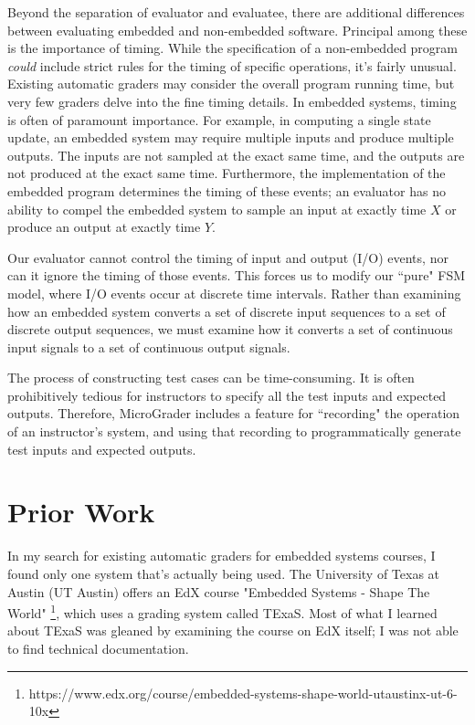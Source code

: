 \documentclass[12pt]{article}
\begin{document}
Beyond the separation of evaluator and evaluatee, there are additional differences between evaluating embedded and non-embedded software.  Principal among these is the importance of timing.  While the specification of a non-embedded program \textit{could} include strict rules for the timing of specific operations, it's fairly unusual.  Existing automatic graders may consider the overall program running time, but very few graders delve into the fine timing details. In embedded systems, timing is often of paramount importance.  For example, in computing a single state update, an embedded system may require multiple inputs and produce multiple outputs.  The inputs are not sampled at the exact same time, and the outputs are not produced at the exact same time.  Furthermore, the implementation of the embedded program determines the timing of these events; an evaluator has no ability to compel the embedded system to sample an input at exactly time $X$ or produce an output at exactly time $Y$.

Our evaluator cannot control the timing of input and output (I/O) events, nor can it ignore the timing of those events.  This forces us to modify our ``pure" FSM model, where I/O events occur at discrete time intervals.  Rather than examining how an embedded system converts a set of discrete input sequences to a set of discrete output sequences, we must examine how it converts a set of continuous input signals to a set of continuous output signals.

The process of constructing test cases can be time-consuming.  It is often prohibitively tedious for instructors to specify all the test inputs and expected outputs.  Therefore, MicroGrader includes a feature for ``recording" the operation of an instructor's system, and using that recording to programmatically generate test inputs and expected outputs. 


\newpage
\section{Prior Work}
In my search for existing automatic graders for embedded systems courses, I found only one system that's actually being used.  The University of Texas at Austin (UT Austin) offers an EdX course "Embedded Systems - Shape The World" \footnote{https://www.edx.org/course/embedded-systems-shape-world-utaustinx-ut-6-10x}, which uses a grading system called TExaS.  Most of what I learned about TExaS was gleaned by examining the course on EdX itself; I was not able to find technical documentation.
\end{document}

